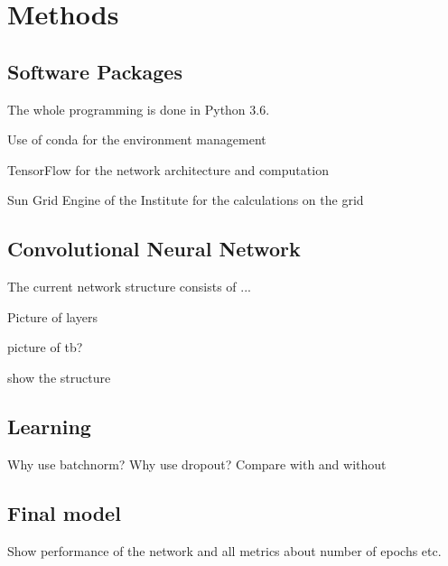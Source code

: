 \documentclass[main.tex]{subfiles}
\begin{document}
\chapter{Methods}
\section{Software Packages}
The whole programming is done in Python 3.6. 

Use of conda for the environment management 

TensorFlow for the network architecture and computation

Sun Grid Engine of the Institute for the calculations on the grid

\section{Convolutional Neural Network}
The current network structure consists of ...

Picture of layers

picture of tb?

show the structure


\section{Learning}
Why use batchnorm?
Why use dropout?
Compare with and without

\section{Final model}
Show performance of the network and all metrics about number of epochs etc.
\end{document}
